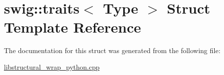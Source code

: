 \hypertarget{structswig_1_1traits}{}\section{swig\+:\+:traits$<$ Type $>$ Struct Template Reference}
\label{structswig_1_1traits}


The documentation for this struct was generated from the following file\+:\begin{DoxyCompactItemize}
\item 
\hyperlink{libstructural__wrap__python_8cpp}{libstructural\+\_\+wrap\+\_\+python.\+cpp}\end{DoxyCompactItemize}
